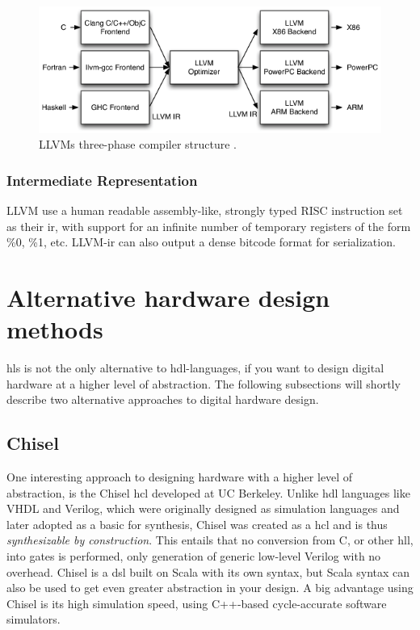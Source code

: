 \begin{figure}[hbpt]
\centering
\includegraphics[width=\textwidth]{../figs/LLVMCompiler.png}
\caption{\label{fig:llvmcompiler}LLVMs three-phase compiler structure \cite{llvmarch}.}
\end{figure}

\subsubsection{Intermediate Representation}
LLVM use a human readable assembly-like, strongly typed RISC instruction set as their \gls{ir}, with support for an infinite number of temporary registers of the form \%0, \%1, etc. LLVM-\gls{ir} can also output a dense bitcode format for serialization.

\section{Alternative hardware design methods}
\gls{hls} is not the only alternative to \gls{hdl}-languages, if you want to design digital hardware at a higher level of abstraction. The following subsections will shortly describe two alternative approaches to digital hardware design. 
\subsection{Chisel}
One interesting approach to designing hardware with a higher level of abstraction, is the Chisel \gls{hcl} \cite{bachrach2012chisel} developed at UC Berkeley. Unlike \gls{hdl} languages like VHDL and Verilog, which were originally designed as simulation languages and later adopted as a basic for synthesis, Chisel was created as a \gls{hcl} and is thus \textit{synthesizable by construction}. This entails that no conversion from C, or other \gls{hll}, into gates is performed, only generation of generic low-level Verilog with no overhead. Chisel is a \gls{dsl} built on Scala \cite{odersky2004overview} with its own syntax, but Scala syntax can also be used to get even greater abstraction in your design. A big advantage using Chisel is its high simulation speed, using C++-based cycle-accurate software simulators.

